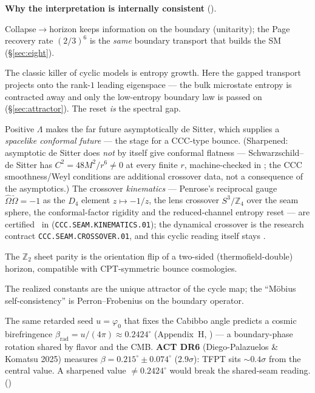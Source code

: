 \documentclass[11pt,a4paper]{article}
\newcommand{\phiz}{\varphi_0}
\newcommand{\Z}{\mathbb Z}
\begin{document}
\par\smallskip\noindent\textbf{Why the interpretation is internally consistent} (\mC).
\begin{description}[leftmargin=2.0em,style=nextline]
\item[\textnormal{Information.}] Collapse$\to$horizon keeps information on the boundary (unitarity); the
Page recovery rate $(2/3)^6$ is the \emph{same} boundary transport that builds the SM (\S\ref{sec:eight}).
\item[\textnormal{Entropy reset (Tolman).}] The classic killer of cyclic models is entropy growth. Here the
gapped transport projects onto the rank-$1$ leading eigenspace --- the bulk microstate entropy is
contracted away and only the low-entropy boundary law is passed on (\S\ref{sec:attractor}). The reset
\emph{is} the spectral gap.
\item[\textnormal{Penrose CCC.}] Positive $\Lambda$ makes the far future asymptotically de Sitter,
which supplies a \emph{spacelike conformal future} --- the stage for a CCC-type bounce.  (Sharpened:
asymptotic de Sitter does \emph{not} by itself give conformal flatness --- Schwarzschild--de Sitter has
$C^2=48M^2/r^6\neq0$ at every finite $r$, machine-checked in ;
the CCC smoothness/Weyl conditions are additional crossover data, not a consequence of the asymptotics.)
The crossover \emph{kinematics} --- Penrose's reciprocal gauge $\hat\Omega\check\Omega=-1$ as the
$D_4$ element $z\mapsto-1/z$, the lens crossover $S^3/\Z_4$ over the seam sphere, the conformal-factor
rigidity and the reduced-channel entropy reset --- are certified \mE\ in
 (\texttt{CCC.SEAM.KINEMATICS.01}); the dynamical crossover is
the research contract \texttt{CCC.SEAM.CROSSOVER.01}, and this cyclic reading itself stays \mC.
\item[\textnormal{CPT / Möbius.}] The $\Z_2$ sheet parity is the orientation flip of a two-sided
(thermofield-double) horizon, compatible with CPT-symmetric bounce cosmologies.
\item[\textnormal{Selection.}] The realized constants are the unique attractor of the cycle map; the
``Möbius self-consistency'' is Perron--Frobenius on the boundary operator.
\item[\textnormal{A live fossil.}] The same retarded seed $u=\phiz$ that fixes the Cabibbo angle predicts a
cosmic birefringence $\beta_{\mathrm{rad}}=u/(4\pi)\approx0.2424^\circ$ (Appendix~H, \mE) --- a
boundary-phase rotation shared by flavor and the CMB. \textbf{ACT DR6} (Diego-Palazuelos \& Komatsu 2025)
measures $\beta=0.215^\circ\pm0.074^\circ$ ($2.9\sigma$): TFPT sits $\sim0.4\sigma$ from the central value.
A sharpened value $\neq0.2424^\circ$ would break the shared-seam reading. ()
\end{description}
\end{document}
